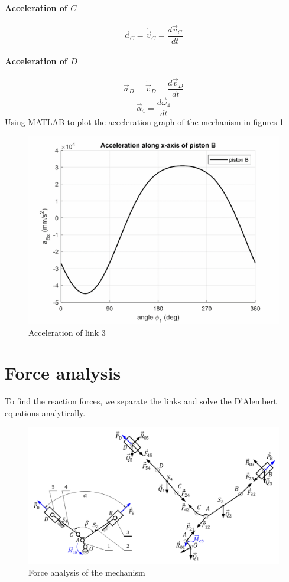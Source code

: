 \paragraph{Acceleration of $ C $}
\begin{equation}\label{aC}
\vec{a}_C=\dot{\vec{v}}_C=\dfrac{d\vec{v}_C}{dt}
\end{equation}
\paragraph{Acceleration of $ D $}
\begin{equation}\label{aD}
\vec{a}_D=\dot{\vec{v}}_D=\dfrac{d\vec{v}_D}{dt}
\end{equation}
\[\vec{\alpha}_4=\dfrac{d\vec{\omega}_4}{dt}\]
Using MATLAB\textup{\textregistered} to plot the acceleration graph of the mechanism in figures \ref{fig:07}
\begin{figure}[ht]
	\centering
	\includegraphics{07}
	\caption{Acceleration of link 3}
	\label{fig:07}
\end{figure}
\section{Force analysis}
To find the reaction forces, we separate the links and solve the D'Alembert equations analytically.
\begin{figure}[ht]
	\centering
	\includegraphics[width=0.8\linewidth]{08}
	\caption{Force analysis of the mechanism}
	\label{fig:08}
\end{figure}

